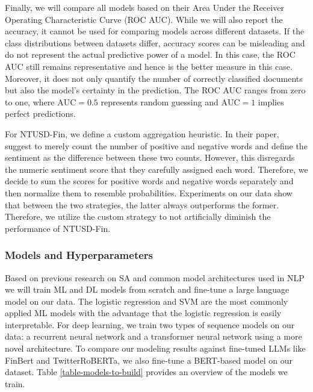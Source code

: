 Finally, we will compare all models based on their Area Under the Receiver Operating Characteristic Curve (ROC AUC). While we will also report the accuracy, it cannot be used for comparing models across different datasets. If the class distributions between datasets differ, accuracy scores can be misleading and do not represent the actual predictive power of a model. In this case, the ROC AUC still remains representative and hence is the better measure in this case. Moreover, it does not only quantify the number of correctly classified documents but also the model's certainty in the prediction. The ROC AUC ranges from zero to one, where $\textrm{AUC}=0.5$ represents random guessing and $\textrm{AUC}=1$ implies perfect predictions.

For NTUSD-Fin, we define a custom aggregation heuristic. In their paper,  suggest to merely count the number of positive and negative words and define the sentiment as the difference between these two counts. However, this disregards the numeric sentiment score that they carefully assigned each word. Therefore, we decide to sum the scores for positive words and negative words separately and then normalize them to resemble probabilities. Experiments on our data show that between the two strategies, the latter always outperforms the former. Therefore, we utilize the custom strategy to not artificially diminish the performance of NTUSD-Fin.

\subsubsection{Models and Hyperparameters}
Based on previous research on SA and common model architectures used in NLP we will train ML and DL models from scratch and fine-tune a large language model on our data. The logistic regression and SVM are the most commonly applied ML models with the advantage that the logistic regression is easily interpretable. For deep learning, we train two types of sequence models on our data: a recurrent neural network and a transformer neural network using a more novel architecture. To compare our modeling results against fine-tuned LLMs like FinBert and TwitterRoBERTa, we also fine-tune a BERT-based model on our dataset. Table \ref{table-models-to-build} provides an overview of the models we train.



